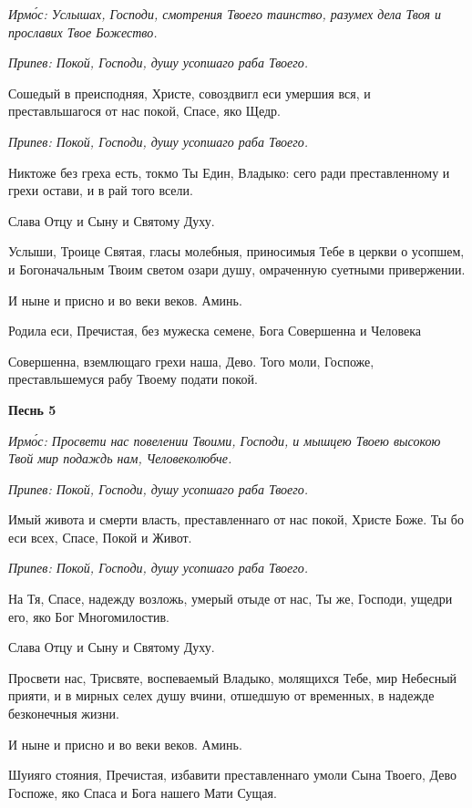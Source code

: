  \itshape Ирмо́с:\normalfont{} Услышах, Господи, смотрения Твоего таинство, разумех дела Твоя и
прославих Твое Божество.


 \itshape Припев:\normalfont{} Покой, Господи, душу усопшаго раба Твоего.


   Сошедый в преисподняя, Христе, совоздвигл еси умершия вся, и
преставльшагося от нас покой, Спасе, яко Щедр.


 \itshape Припев:\normalfont{} Покой, Господи, душу усопшаго раба Твоего.


   Никтоже без греха есть, токмо Ты Един, Владыко: сего ради
преставленному и грехи остави, и в рай того всели.


   Слава Отцу и Сыну и Святому Духу.


   Услыши, Троице Святая, гласы молебныя, приносимыя Тебе в церкви о
усопшем, и Богоначальным Твоим светом озари душу, омраченную суетными
привержении.


   И ныне и присно и во веки веков. Аминь.


   Родила еси, Пречистая, без мужеска семене, Бога Совершенна и Человека

Совершенна, вземлющаго грехи наша, Дево. Того моли, Госпоже,
преставльшемуся рабу Твоему подати покой.



 

\bfseries Песнь 5\normalfont{}


 \itshape Ирмо́с:\normalfont{} Просвети нас повелении Твоими, Господи, и мышцею Твоею высокою
Твой мир подаждь нам, Человеколюбче.


 \itshape Припев:\normalfont{} Покой, Господи, душу усопшаго раба Твоего.


   Имый живота и смерти власть, преставленнаго от нас покой, Христе
Боже. Ты бо еси всех, Спасе, Покой и Живот.


 \itshape Припев:\normalfont{} Покой, Господи, душу усопшаго раба Твоего.


   На Тя, Спасе, надежду возложь, умерый отыде от нас, Ты же, Господи,
ущедри его, яко Бог Многомилостив.


   Слава Отцу и Сыну и Святому Духу.


   Просвети нас, Трисвяте, воспеваемый Владыко, молящихся Тебе, мир
Небесный прияти, и в мирных селех душу вчини, отшедшую от временных, в
надежде безконечныя жизни.


   И ныне и присно и во веки веков. Аминь.


   Шуияго стояния, Пречистая, избавити преставленнаго умоли Сына
Твоего, Дево Госпоже, яко Спаса и Бога нашего Мати Сущая.



